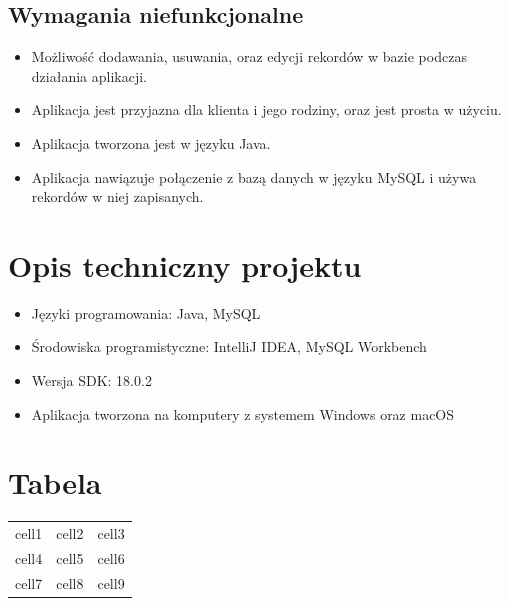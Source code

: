 \documentclass[12pt, letterpaper]{article}
\begin{document}
\newpage

\subsection{Wymagania niefunkcjonalne}
\begin{itemize}
\item Możliwość dodawania, usuwania, oraz edycji rekordów w bazie podczas działania aplikacji.
\item Aplikacja jest przyjazna dla klienta i jego rodziny, oraz jest prosta w użyciu.
\item Aplikacja tworzona jest w języku Java.
\item Aplikacja nawiązuje połączenie z bazą danych w języku MySQL i używa rekordów w niej zapisanych.
\end{itemize}

\section{Opis techniczny projektu}
\begin{itemize}
\item Języki programowania: Java, MySQL
\item Środowiska programistyczne: IntelliJ IDEA, MySQL Workbench
\item Wersja SDK: 18.0.2
\item Aplikacja tworzona na komputery z systemem Windows oraz macOS
\end{itemize}

\section{Tabela}

\begin{center}
\begin{tabular}{|c|c|c|}
\hline
cell1 & cell2 & cell3 \\
cell4 & cell5 & cell6 \\
cell7 & cell8 & cell9 \\
\hline
\end{tabular}
\end{center}
\end{document}
